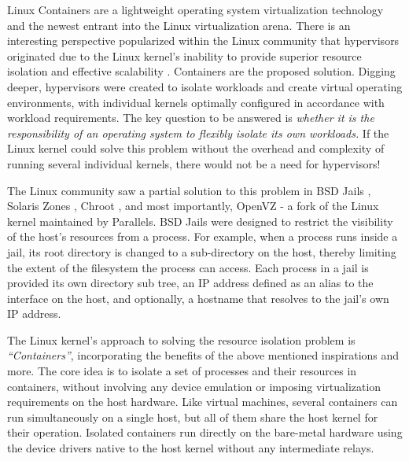 




Linux Containers are a lightweight operating system virtualization technology and the newest entrant into the Linux virtualization arena. There is an interesting perspective popularized within the Linux community that hypervisors originated due to the Linux kernel's inability to provide superior resource isolation and effective scalability \cite{linux_incompetent}. Containers are the proposed solution. Digging deeper, hypervisors were created to isolate workloads and create virtual operating environments, with individual kernels optimally configured in accordance with workload requirements. The key question to be answered is
\emph{whether it is the responsibility of an operating system to flexibly isolate its own workloads.}
If the Linux kernel could solve this problem without the overhead and complexity of running several individual kernels, there would not be a need for hypervisors!


The Linux community saw a partial solution to this problem in BSD Jails \cite{jails}, Solaris Zones \cite{zones}, Chroot \cite{chroot}, and most importantly, OpenVZ \cite{openvz} - a fork of the Linux kernel maintained by Parallels. BSD Jails were designed to restrict the visibility of the host's resources from a process. For example, when a process runs inside a jail, its root directory is changed to a sub-directory on the host, thereby limiting the extent of the filesystem the process can access. Each process in a jail is provided its own directory sub tree, an IP address defined as an alias to the interface on the host, and optionally, a hostname that resolves to the jail's own IP address. 

The Linux kernel's approach to solving the resource isolation problem is \emph{``Containers''}, incorporating the benefits of the above mentioned inspirations and more. The core idea is to isolate a set of processes and their resources in containers, without involving any device emulation or imposing virtualization requirements on the host hardware. Like virtual machines, several containers can run simultaneously on a single host, but all of them share the host kernel for their operation. Isolated containers run directly on the bare-metal hardware using the device drivers native to the host kernel without any intermediate relays. 


